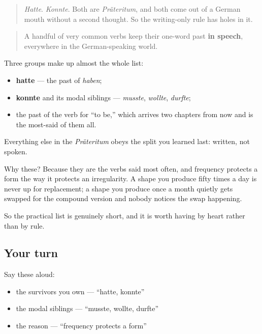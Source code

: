 \label{lesson:GE-C15-hochfrequent}



\begin{quote}
\emph{Hatte}. \emph{Konnte}. Both are \emph{Präteritum}, and both come out of a German mouth without a second thought. So the writing-only rule has holes in it.
\end{quote}

\begin{grammarlens}[title={Grammar Lens: a short list of survivors}]
\begin{quote}
A handful of very common verbs keep their one-word past \textbf{in speech}, everywhere in the German-speaking world.
\end{quote}

Three groups make up almost the whole list:

\begin{itemize}
\raggedright
  \item \textbf{hatte} — the past of \emph{haben};
  \item \textbf{konnte} and its modal siblings — \emph{musste}, \emph{wollte}, \emph{durfte};
  \item the past of the verb for \textquotedblleft{}to be,\textquotedblright{} which arrives two chapters from now and is the most-said of them all.
\end{itemize}

Everything else in the \emph{Präteritum} obeys the split you learned last: written, not spoken.

Why these? Because they are the verbs said most often, and frequency protects a form the way it protects an irregularity. A shape you produce fifty times a day is never up for replacement; a shape you produce once a month quietly gets swapped for the compound version and nobody notices the swap happening.

So the practical list is genuinely short, and it is worth having by heart rather than by rule.
\end{grammarlens}

\subsection*{Your turn}
Say these aloud:

\begin{itemize}
\raggedright
  \item the survivors you own — \textquotedblleft{}hatte, konnte\textquotedblright{}
  \item the modal siblings — \textquotedblleft{}musste, wollte, durfte\textquotedblright{}
  \item the reason — \textquotedblleft{}frequency protects a form\textquotedblright{}
\end{itemize}

